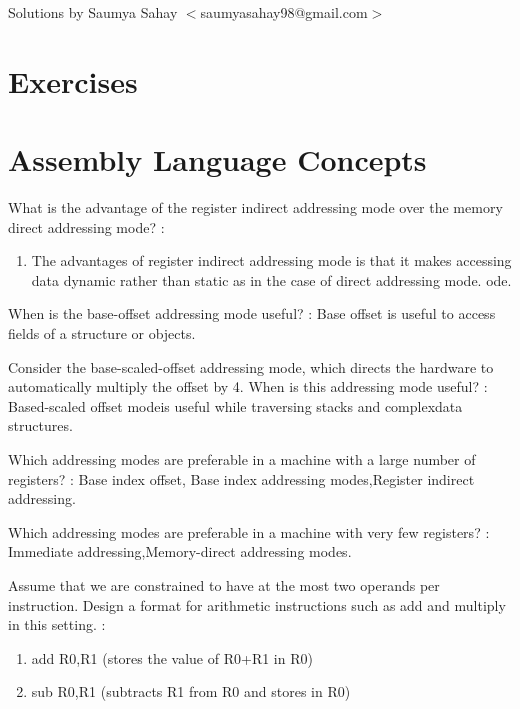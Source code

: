 \vskip 2cm
\begin{flushright}
Solutions by Saumya Sahay $<$saumyasahay98@gmail.com$>$
\end{flushright}
\section*{Exercises}
\vskip 1cm

\setcounter{Exercise}{0}
\setcounter{Answer}{0}

\section*{Assembly Language Concepts}

\begin{ExerciseList}

\Exercise What is the advantage of the register indirect addressing mode over the memory direct
addressing mode?
\Answer :
\begin{enumerate}
\item The advantages of register indirect addressing mode is that it makes accessing data dynamic rather than static as in the case of direct addressing mode.
ode.
\end{enumerate}

\Exercise 
When is the base-offset addressing mode useful?
\Answer :
Base offset is useful to access fields of a structure or objects.

\Exercise
Consider the base-scaled-offset addressing mode, which directs the hardware to automatically
multiply the offset by 4. When is this addressing mode useful?
\Answer :
Based-scaled offset modeis useful while traversing stacks and complexdata structures.

\Exercise Which addressing modes are preferable in a machine with a large number of registers?
\Answer :
Base index offset, Base index addressing modes,Register indirect addressing.

\Exercise Which addressing modes are preferable in a machine with very few registers?
\Answer :
Immediate addressing,Memory-direct addressing modes.

\Exercise Assume that we are constrained to have at the most two operands per instruction. Design
a format for arithmetic instructions such as add and multiply in this setting.
\Answer :
\begin{enumerate}
\item add R0,R1 (stores the value of R0+R1 in R0)
\item sub R0,R1 (subtracts R1 from R0 and stores in R0)
\end{enumerate}


\end{ExerciseList}


